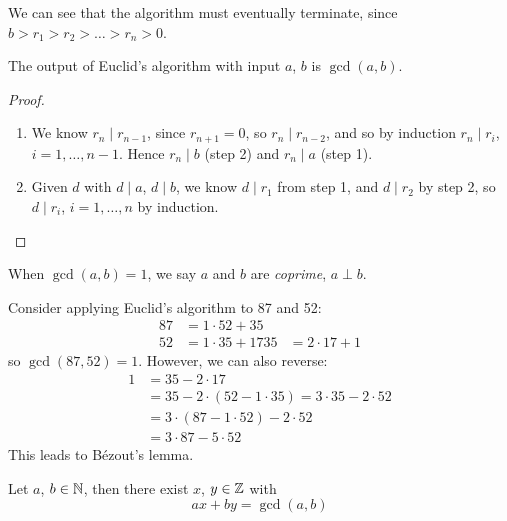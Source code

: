 \documentclass{../../template/note}
\begin{document}
    We can see that the algorithm must eventually terminate, since \(b > r_1 > r_2 > \dots > r_n > 0\).
    
    \begin{theorem}
        The output of Euclid's algorithm with input \(a\), \(b\) is \(\gcd(a, b)\).
    \end{theorem}
    
    \begin{proof}
        \begin{enumerate}
            \item We know \(r_n \mid r_{n-1}\), since \(r_{n+1} = 0\), so \(r_n \mid r_{n-2}\), and so by induction \(r_n \mid r_i\), \(i = 1, \dots, n-1\). Hence \(r_n \mid b\) (step 2) and \(r_n \mid a\) (step 1).
            \item Given \(d\) with \(d \mid a\), \(d \mid b\), we know \(d \mid r_1\) from step 1, and \(d \mid r_2\) by step 2, so \(d \mid r_i\), \(i = 1, \dots, n\) by induction.
        \end{enumerate}
    \end{proof}

    
    \begin{definition}
        When \(\gcd(a, b)=1\), we say \(a\) and \(b\) are \emph{coprime}, \(a \perp b\).
    \end{definition}
    
    \begin{example}
        Consider applying Euclid's algorithm to 87 and 52:
        \begin{align*}
            87 &= 1 \cdot 52 + 35 \\
            52 &= 1 \cdot 35 + 17
            35 &= 2 \cdot 17 + 1
        \end{align*}
        so \(\gcd(87, 52) = 1\). However, we can also reverse:
        \begin{align*}
            1 &= 35 - 2 \cdot 17 \\
            &= 35 - 2 \cdot (52 - 1 \cdot 35) = 3 \cdot 35 - 2 \cdot 52 \\
            &= 3 \cdot (87 - 1 \cdot 52) - 2 \cdot 52 \\
            &= 3 \cdot 87 - 5 \cdot 52
        \end{align*}
        This leads to B\'ezout's lemma.                
    \end{example}
    
    \begin{theorem}
        \label{bezout} Let \(a\), \(b \in \mathbb N\), then there exist \(x\), \(y \in \mathbb Z\) with
        \[
            ax + by = \gcd(a, b)
        \]
    \end{theorem}
    
\end{document}
